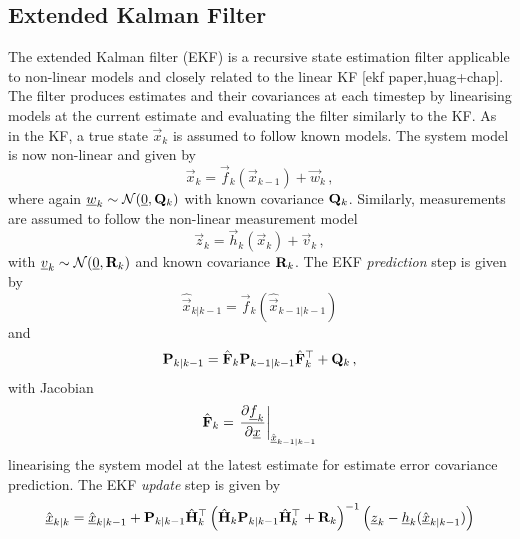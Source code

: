 % 
% 

\subsection{Extended Kalman Filter}\label{subsec:prelims:ekf}
The extended Kalman filter (EKF) is a recursive state estimation filter applicable to non-linear models and closely related to the linear KF [ekf paper,huag+chap]. The filter produces estimates and their covariances at each timestep by linearising models at the current estimate and evaluating the filter similarly to the KF. As in the KF, a true state $\vec{x}_k$ is assumed to follow known models. The system model is now non-linear and given by
\begin{equation}\label{eq:prelims:nonlin_gauss_system_model}
    \vec{x}_k = \vec{f}_k(\vec{x}_{k-1}) + \vec{w}_k\,,
\end{equation}
where again ${\underline{w}}_k \sim \mathcal{N}({\underline{0}}, {{\mathbf{Q}}}_k)$ with known covariance ${{\mathbf{Q}}}_k$. Similarly, measurements are assumed to follow the non-linear measurement model
\begin{equation}\label{eq:prelims:nonlin_gauss_measurement_model}
    \vec{z}_k = \vec{h}_k(\vec{x}_k) + \vec{v}_k\,,
\end{equation}
with ${\underline{v}}_k \sim \mathcal{N}({\underline{0}}, {{\mathbf{R}}}_k)$ and known covariance ${{\mathbf{R}}}_k$. The EKF \textit{prediction} step is given by
\begin{equation}\label{eq:prelims:ekf_est_predict}
    \hat{\vec{x}}_{k|k-1} = \vec{f}_k\left(\hat{\vec{x}}_{k-1|k-1}\right)
\end{equation}
and
\begin{equation}\label{eq:prelims:ekf_cov_predict}
    {\ensuremath{{\mathbf{P}}}}_{k|k-1} = \hat{{{\mathbf{F}}}}_k {{\mathbf{P}}}_{k-1|k-1} \hat{{{\mathbf{F}}}}_k^\top + {{\mathbf{Q}}}_k\,,
\end{equation}
with Jacobian
\begin{equation}\label{eq:prelims:ekf_predict_jacobian}
    \hat{{{\mathbf{F}}}}_k = \left.\frac{\partial {\underline{f}}_k}{\partial {\underline{x}}}\right|_{\hat{{\underline{x}}}_{k-1|k-1}}
\end{equation}
linearising the system model at the latest estimate for estimate error covariance prediction. The EKF \textit{update} step is given by
\begin{equation}\label{eq:prelims:ekf_est_update}
    \hat{{\underline{x}}}_{k|k} = \hat{{\underline{x}}}_{k|k-1}+{{\mathbf{P}}}_{k|k-1}\hat{{{\mathbf{H}}}}_k^\top\left(\hat{{{\mathbf{H}}}}_k{{\mathbf{P}}}_{k|k-1}\hat{{{\mathbf{H}}}}_k^\top + {{\mathbf{R}}}_k\right)^{-1}\left({\underline{z}}_k-{\underline{h}}_k(\hat{{\underline{x}}}_{k|k-1})\right)
\end{equation}
